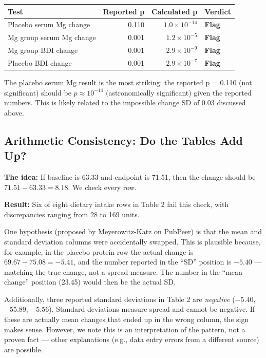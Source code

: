 \documentclass[11pt]{article}
\begin{document}
\begin{center}
\begin{tabular}{lrrl}
\toprule
\textbf{Test} & \textbf{Reported p} & \textbf{Calculated p} & \textbf{Verdict} \\
\midrule
Placebo serum Mg change & 0.110 & $1.0 \times 10^{-14}$ & \textcolor{flag}{\textbf{Flag}} \\
Mg group serum Mg change & 0.001 & $1.2 \times 10^{-5}$ & \textcolor{flag}{\textbf{Flag}} \\
Mg group BDI change & 0.001 & $2.9 \times 10^{-9}$ & \textcolor{flag}{\textbf{Flag}} \\
Placebo BDI change & 0.001 & $2.9 \times 10^{-7}$ & \textcolor{flag}{\textbf{Flag}} \\
\bottomrule
\end{tabular}
\end{center}

\noindent The placebo serum Mg result is the most striking: the reported p = 0.110 (not significant) should be $p \approx 10^{-14}$ (astronomically significant) given the reported numbers. This is likely related to the impossible change SD of 0.03 discussed above.

\subsection{Arithmetic Consistency: Do the Tables Add Up?}

\textbf{The idea:} If baseline is 63.33 and endpoint is 71.51, then the change should be $71.51 - 63.33 = 8.18$. We check every row.

\textbf{Result:} Six of eight dietary intake rows in Table 2 fail this check, with discrepancies ranging from 28 to 169 units.

One hypothesis (proposed by Meyerowitz-Katz on PubPeer) is that the mean and standard deviation columns were accidentally swapped. This is plausible because, for example, in the placebo protein row the actual change is $69.67 - 75.08 = -5.41$, and the number reported in the ``SD'' position is $-5.40$ --- matching the true change, not a spread measure. The number in the ``mean change'' position (23.45) would then be the actual SD.

Additionally, three reported standard deviations in Table 2 are \textit{negative} ($-5.40$, $-55.89$, $-5.56$). Standard deviations measure spread and cannot be negative. If these are actually mean changes that ended up in the wrong column, the sign makes sense. However, we note this is an interpretation of the pattern, not a proven fact --- other explanations (e.g., data entry errors from a different source) are possible.
\end{document}

